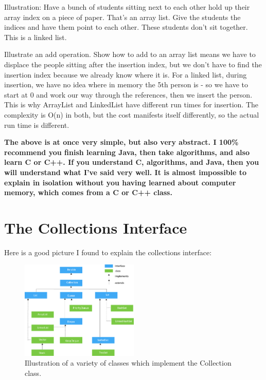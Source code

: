 \documentclass[12pt]{article}
\begin{document}
\begin{center}
{\LARGE Illustration: Have a  bunch of students sitting next to each other hold up their array index on a piece of paper. That's an array list. Give the students the indices and have them point to each other. These students don't sit together. This is a linked list.}
\end{center}

\begin{center}
{\LARGE Illustrate an add operation. Show how to add to an array list means we have to displace the people sitting after the insertion index, but we don't have to find the insertion index because we already know where it is. For a linked list, during insertion, we have no idea where in memory the 5th person is - so we have to start at 0 and work our way through the references, then we insert the person. This is why ArrayList and LinkedList have different run times for insertion. The complexity is O(n) in both, but the cost manifests itself differently, so the actual run time is different.}
\end{center}

\begin{center}
\textbf{The above is at once very simple, but also very abstract. I 100\% recommend you finish learning Java, then take algorithms, and also learn C or C++. If you understand C, algorithms, and Java, then you will understand what I've said very well. It is almost impossible to explain in isolation without you having learned about computer memory, which comes from a C or C++ class.}
\end{center}


\section{The Collections Interface}
Here is a good picture I found to explain the collections interface:

\begin{figure}[h]
  \centering
    \includegraphics[width=0.5\textwidth]{java-collection-hierarchy.png}
  \caption{Illustration of a variety of classes which implement the Collection class.}
\end{figure}
\end{document}

